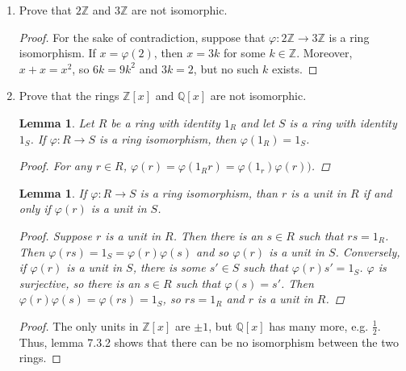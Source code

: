 \documentclass{report}
\newcommand{\Z}{\mathbb{Z}}
\newcommand{\Q}{\mathbb{Q}}
\newtheorem{lemma}[theorem]{Lemma}
\begin{document}
\begin{enumerate}
    \item Prove that $2\Z$ and $3\Z$ are not isomorphic. 
        \begin{proof}
            For the sake of contradiction, suppose that $\varphi:2\Z\rightarrow 3\Z$ is a ring isomorphism. If $x=\varphi(2)$, then $x=3k$ for some $k\in \Z$. Moreover, $x+x=x^2$, so $6k=9k^2$ and $3k=2$, but no such $k$ exists.
        \end{proof}

        
    \item Prove that the rings $\Z[x]$ and $\Q[x]$ are not isomorphic. 
    \begin{lemma}
        Let $R$ be a ring with identity $1_R$ and let $S$ is a ring with identity $1_S$. If $\varphi:R\rightarrow S$ is a ring isomorphism, then $\varphi(1_R)=1_S$.
        \begin{proof}
            For any $r\in R$, $\varphi(r)=\varphi(1_R r)=\varphi(1_r)\varphi(r))$.
        \end{proof}
    \end{lemma}
    \begin{lemma}
        If $\varphi:R\rightarrow S$ is a ring isomorphism, than $r$ is a unit in $R$ if and only if $\varphi(r)$ is a unit in $S$.
        \begin{proof}
            Suppose $r$ is a unit in $R$. Then there is an $s\in R$ such that $rs=1_R$. Then $\varphi(rs)=1_S=\varphi(r)\varphi(s)$ and so $\varphi(r)$ is a unit in $S$. Conversely, if $\varphi(r)$ is a unit in $S$, there is some $s'\in S$ such that $\varphi(r)s'=1_S$. $\varphi$ is surjective, so there is an $s\in R$ such that $\varphi(s)=s'$. Then $\varphi(r)\varphi(s)=\varphi(rs)=1_S$, so $rs=1_R$ and $r$ is a unit in $R$.
        \end{proof}
    \end{lemma}
    \begin{proof}
        The only units in $\Z[x]$ are $\pm 1$, but $\Q[x]$ has many more, e.g. $\frac{1}{2}$. Thus, lemma 7.3.2 shows that there can be no isomorphism between the two rings.
    \end{proof}


\end{enumerate}
\end{document}
